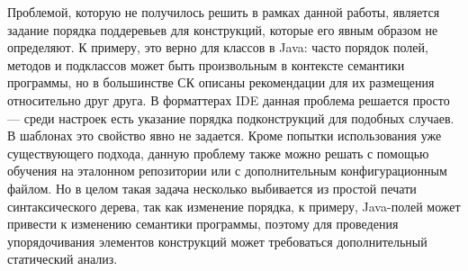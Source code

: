 Проблемой, которую не получилось решить в рамках данной работы,
является задание порядка поддеревьев для конструкций, которые
его явным образом не определяют. К примеру, это верно для классов в Java:
часто порядок полей, методов и подклассов может быть произвольным в контексте
семантики программы, но в большинстве СК описаны рекомендации для их размещения
относительно друг друга. В форматтерах IDE данная проблема решается просто ---
среди настроек есть указание порядка подконструкций для подобных случаев.
В шаблонах это свойство явно не задается. Кроме попытки использования
уже существующего подхода, данную проблему также можно 
решать с помощью обучения на эталонном репозитории или с дополнительным
конфигурационным файлом. Но в целом такая задача несколько выбивается из
простой печати синтаксического дерева, так как изменение порядка, к примеру,
Java-полей может привести к изменению семантики программы, поэтому для проведения
упорядочивания элементов конструкций может требоваться дополнительный статический
анализ.
